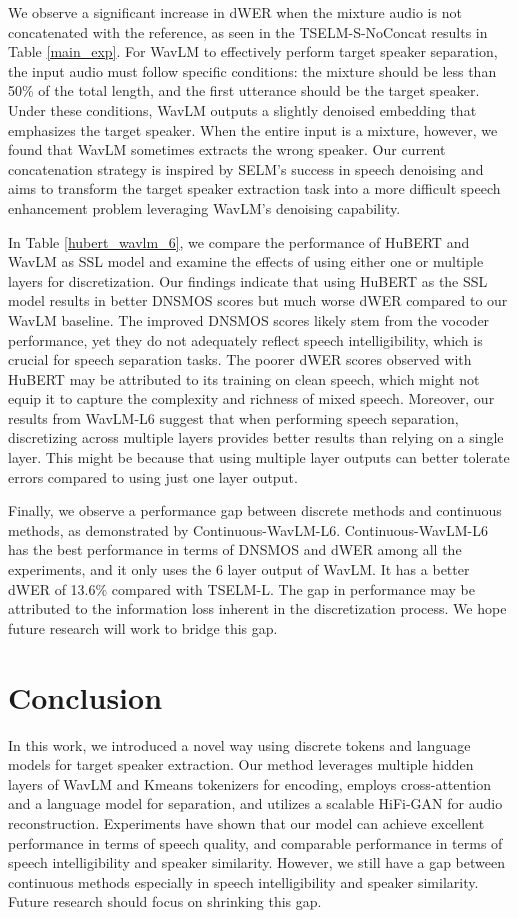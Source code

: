 \documentclass[conference]{IEEEtran}
\begin{document}
We observe a significant increase in dWER when the mixture audio is not concatenated with the reference, as seen in the TSELM-S-NoConcat results in Table \ref{main_exp}. For WavLM to effectively perform target speaker separation, the input audio must follow specific conditions: the mixture should be less than 50\% of the total length, and the first utterance should be the target speaker. Under these conditions, WavLM outputs a slightly denoised embedding that emphasizes the target speaker. When the entire input is a mixture, however, we found that WavLM sometimes extracts the wrong speaker.
Our current concatenation strategy is inspired by SELM's \cite{selm} success in speech denoising and aims to transform the target speaker extraction task into a more difficult speech enhancement problem leveraging WavLM's denoising capability.

In Table \ref{hubert_wavlm_6}, we compare the performance of HuBERT and WavLM as SSL model and examine the effects of using either one or multiple layers for discretization. Our findings indicate that using HuBERT as the SSL model results in better DNSMOS scores but much worse dWER compared to our WavLM baseline. The improved DNSMOS scores likely stem from the vocoder performance, yet they do not adequately reflect speech intelligibility, which is crucial for speech separation tasks. 
The poorer dWER scores observed with HuBERT may be attributed to its training on clean speech, which might not equip it to capture the complexity and richness of mixed speech. Moreover, our results from WavLM-L6 suggest that when performing speech separation, discretizing across multiple layers provides better results than relying on a single layer.  This might be because that using multiple layer outputs can better tolerate errors compared to using just one layer output.

Finally, we observe a performance gap between discrete methods and continuous methods, as demonstrated by Continuous-WavLM-L6.
Continuous-WavLM-L6 has the best performance in terms of DNSMOS and dWER among all the experiments, and it only uses the 6 layer output of WavLM. 
It has a better dWER of 13.6\% compared with TSELM-L. The gap in performance may be attributed to the information loss inherent in the discretization process. 
We hope future research will work to bridge this gap.   

\section{Conclusion}
In this work, we introduced a novel way using discrete tokens and language models for target speaker extraction.
Our method leverages multiple hidden layers of WavLM and Kmeans tokenizers for encoding, employs cross-attention and a language model for separation, and utilizes a scalable HiFi-GAN for audio reconstruction.
Experiments have 
shown that our model can achieve excellent performance in terms of speech quality, and comparable performance in terms of speech intelligibility and 
speaker similarity. However, we still have a gap between continuous methods especially in speech intelligibility and speaker similarity. Future research should focus on shrinking 
this gap. 
\end{document}
